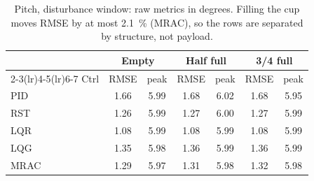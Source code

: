 \begin{table}[!ht]
\centering
\caption{Pitch, disturbance window: raw metrics in degrees. Filling the cup moves RMSE by at most \SI{2.1}{\percent} (MRAC), so the rows are separated by structure, not payload.}
\label{tab:rawpitch}
\footnotesize
\begin{tabular}{lcccccc}
\toprule
& \multicolumn{2}{c}{Empty} & \multicolumn{2}{c}{Half full} & \multicolumn{2}{c}{3/4 full} \\
\cmidrule(lr){2-3}\cmidrule(lr){4-5}\cmidrule(lr){6-7}
Ctrl & RMSE & peak & RMSE & peak & RMSE & peak \\
\midrule
PID & 1.66 & 5.99 & 1.68 & 6.02 & 1.68 & 5.95 \\
RST & 1.26 & 5.99 & 1.27 & 6.00 & 1.27 & 5.99 \\
LQR & 1.08 & 5.99 & 1.08 & 5.99 & 1.08 & 5.99 \\
LQG & 1.35 & 5.98 & 1.36 & 5.99 & 1.36 & 5.99 \\
MRAC & 1.29 & 5.97 & 1.31 & 5.98 & 1.32 & 5.98 \\
\bottomrule
\end{tabular}
\end{table}
